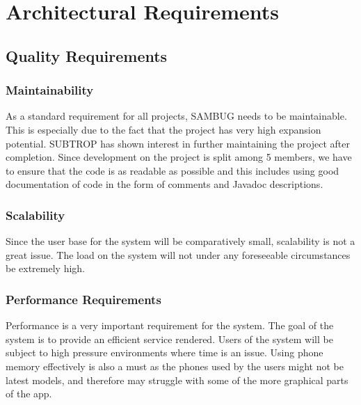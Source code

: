 \documentclass[11pt,a4paper,titlepage]{article}
\begin{document}
	
    


\tableofcontents

\pagebreak


\pagebreak


		
		
\section{Architectural Requirements}
	\subsection{Quality Requirements}
		\subsubsection{Maintainability}
			As a standard requirement for all projects, SAMBUG needs to be maintainable. This is especially due to the fact that the project has very high expansion potential. SUBTROP has shown interest in further maintaining the project after completion.
			Since development on the project is split among 5 members, we have to ensure that the code is as readable as possible and this includes using good documentation of code in the form of comments and Javadoc descriptions.
		\subsubsection{Scalability}
			Since the user base for the system will be comparatively small, scalability is not a great issue. The load on the system will not under any foreseeable circumstances be extremely high. 
		\subsubsection{Performance Requirements}
			Performance is a very important requirement for the system. The goal of the system is to provide an efficient service rendered. Users of the system will be subject to high pressure environments where time is an issue. Using phone memory effectively is also a must as the phones used by the users might not be latest models, and therefore may struggle with some of the more graphical parts of the app.
\end{document}
